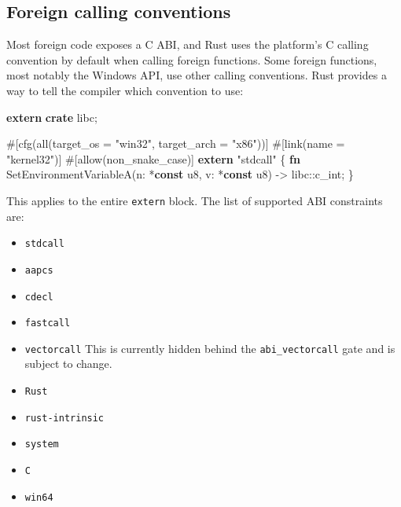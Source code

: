 \documentclass[a4paper,]{book}
\newenvironment{Shaded}{\begin{snugshade}}{\end{snugshade}}
\newcommand{\KeywordTok}[1]{\textcolor[rgb]{0.13,0.29,0.53}{\textbf{{#1}}}}
\newcommand{\DataTypeTok}[1]{\textcolor[rgb]{0.13,0.29,0.53}{{#1}}}
\newcommand{\StringTok}[1]{\textcolor[rgb]{0.31,0.60,0.02}{{#1}}}
\newcommand{\AttributeTok}[1]{\textcolor[rgb]{0.77,0.63,0.00}{{#1}}}
\newcommand{\NormalTok}[1]{{#1}}
\providecommand{\tightlist}{%
  \setlength{\itemsep}{0pt}\setlength{\parskip}{0pt}}
\begin{document}
\hypertarget{foreign-calling-conventions}{\subsection{Foreign calling
conventions}\label{foreign-calling-conventions}}

Most foreign code exposes a C ABI, and Rust uses the platform's C
calling convention by default when calling foreign functions. Some
foreign functions, most notably the Windows API, use other calling
conventions. Rust provides a way to tell the compiler which convention
to use:

\begin{Shaded}
\begin{Highlighting}[]
\KeywordTok{extern} \KeywordTok{crate} \NormalTok{libc;}

\AttributeTok{#[}\NormalTok{cfg}\AttributeTok{(}\NormalTok{all}\AttributeTok{(}\NormalTok{target_os }\AttributeTok{=} \StringTok{"win32"}\AttributeTok{,} \NormalTok{target_arch }\AttributeTok{=} \StringTok{"x86"}\AttributeTok{))]}
\AttributeTok{#[}\NormalTok{link}\AttributeTok{(}\NormalTok{name }\AttributeTok{=} \StringTok{"kernel32"}\AttributeTok{)]}
\AttributeTok{#[}\NormalTok{allow}\AttributeTok{(}\NormalTok{non_snake_case}\AttributeTok{)]}
\KeywordTok{extern} \StringTok{"stdcall"} \NormalTok{\{}
    \KeywordTok{fn} \NormalTok{SetEnvironmentVariableA(n: *}\KeywordTok{const} \DataTypeTok{u8}\NormalTok{, v: *}\KeywordTok{const} \DataTypeTok{u8}\NormalTok{) -> libc::}\DataTypeTok{c_int}\NormalTok{;}
\NormalTok{\}}
\end{Highlighting}
\end{Shaded}

This applies to the entire \texttt{extern} block. The list of supported
ABI constraints are:

\begin{itemize}
\tightlist
\item
  \texttt{stdcall}
\item
  \texttt{aapcs}
\item
  \texttt{cdecl}
\item
  \texttt{fastcall}
\item
  \texttt{vectorcall} This is currently hidden behind the
  \texttt{abi\_vectorcall} gate and is subject to change.
\item
  \texttt{Rust}
\item
  \texttt{rust-intrinsic}
\item
  \texttt{system}
\item
  \texttt{C}
\item
  \texttt{win64}
\end{itemize}
\end{document}
